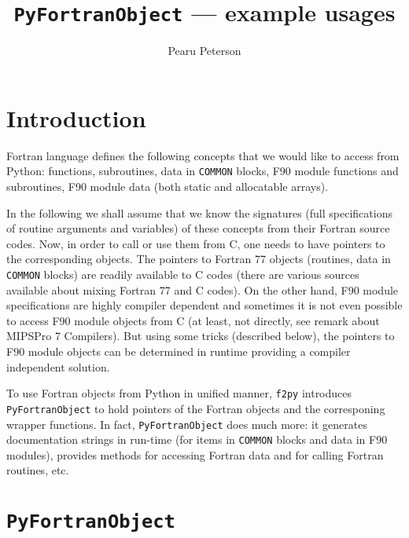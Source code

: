\documentclass{article}
\title{\texttt{PyFortranObject} --- example usages}
\author{
\large Pearu Peterson\\
\small \email{pearu@cens.ioc.ee}
}
\newcommand{\fpy}{\texttt{f2py}\xspace}
\begin{document}
\maketitle


\tableofcontents

\section{Introduction}
\label{sec:intro}

Fortran language defines the following concepts that we would like to
access from Python: functions, subroutines, data in \texttt{COMMON} blocks,
F90 module functions and subroutines, F90 module data (both static and
allocatable arrays).

In the following we shall assume that we know the signatures (full
specifications of routine arguments and variables) of these concepts
from their Fortran source codes.  Now, in order to call or use them
from C, one needs to have pointers to the corresponding objects. The
pointers to Fortran 77 objects (routines, data in \texttt{COMMON}
blocks) are readily available to C codes (there are various sources
available about mixing Fortran 77 and C codes). On the other hand, F90
module specifications are highly compiler dependent and sometimes it
is not even possible to access F90 module objects from C (at least,
not directly, see remark about MIPSPro 7 Compilers). But using some
tricks (described below), the pointers to F90 module objects can be
determined in runtime providing a compiler independent solution.

To use Fortran objects from Python in unified manner, \fpy introduces
\texttt{PyFortranObject} to hold pointers of the Fortran objects and
the corresponing wrapper functions.  In fact, \texttt{PyFortranObject}
does much more: it generates documentation strings in run-time (for
items in \texttt{COMMON} blocks and data in F90 modules), provides
methods for accessing Fortran data and for calling Fortran routines,
etc.

\section{\texttt{PyFortranObject}}
\label{sec:pyfortobj}
\end{document}
